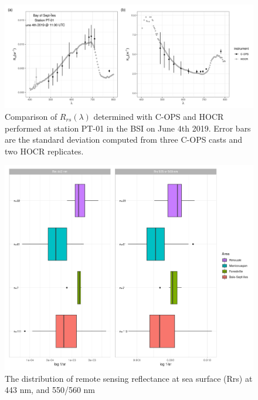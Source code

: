 \documentclass[essd, manuscript]{copernicus}
\begin{document}
\begin{figure}
    \centering
    \includegraphics{Figures/Rrs_HOCR-COPS-PT01-June4th2019.png}
    \caption{Comparison of $R_{rs}(\lambda)$ determined with C-OPS and HOCR performed at station PT-01 in the BSI on June 4th 2019. Error bars are the standard deviation computed from three C-OPS casts and two HOCR replicates. }
    \label{fig:PT01}
\end{figure}



\begin{figure}[t]
    \includegraphics[width=12cm]{Figures/boxplot_Rrs.png}
    \caption{The distribution of remote sensing reflectance at sea surface (Rrs) at 443 nm, and 550/560 nm }
    \label{fig:Rrs443}
\end{figure}
\end{document}

